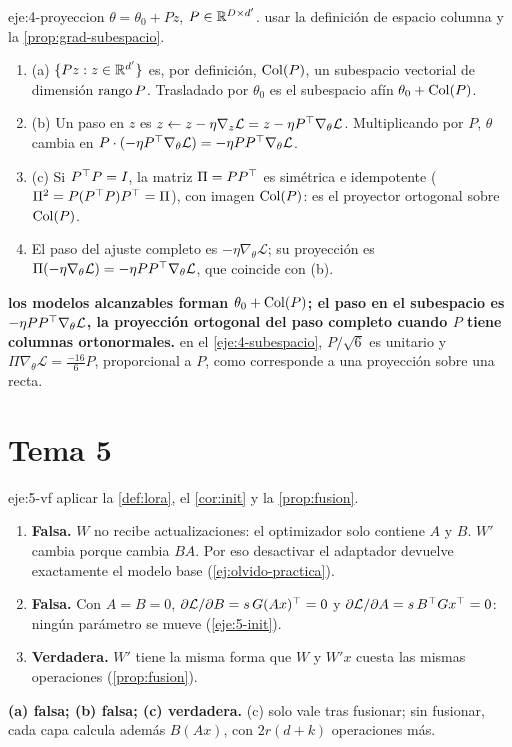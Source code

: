 \begin{solucion}{eje:4-proyeccion}
\datos $\theta=\theta_0+Pz$, $P\in\mathbb{R}^{D\times d'}$.
\planteamiento usar la definición de espacio columna y la \cref{prop:grad-subespacio}.
\pasos
\begin{enumerate}[label=\arabic*.]
  \item (a) $\{Pz:z\in\mathbb{R}^{d'}\}$ es, por definición, $\operatorname{Col}(P)$, un subespacio vectorial de dimensión $\operatorname{rango} P$. Trasladado por $\theta_0$ es el subespacio afín $\theta_0+\operatorname{Col}(P)$.
  \item (b) Un paso en $z$ es $z\gets z-\eta\nabla_z\mathcal{L}=z-\eta P^{\top}\nabla_\theta\mathcal{L}$. Multiplicando por $P$, $\theta$ cambia en $P\cdot(-\eta P^{\top}\nabla_\theta\mathcal{L})=-\eta PP^{\top}\nabla_\theta\mathcal{L}$.
  \item (c) Si $P^{\top} P=I$, la matriz $\Pi=PP^{\top}$ es simétrica e idempotente ($\Pi^{2}=P(P^{\top} P)P^{\top}=\Pi$), con imagen $\operatorname{Col}(P)$: es el proyector ortogonal sobre $\operatorname{Col}(P)$.
  \item El paso del ajuste completo es $-\eta\nabla_\theta\mathcal{L}$; su proyección es $\Pi(-\eta\nabla_\theta\mathcal{L})=-\eta PP^{\top}\nabla_\theta\mathcal{L}$, que coincide con (b).
\end{enumerate}
\resultado \textbf{los modelos alcanzables forman $\theta_0+\operatorname{Col}(P)$; el paso en el subespacio es $-\eta PP^{\top}\nabla_\theta\mathcal{L}$, la proyección ortogonal del paso completo cuando $P$ tiene columnas ortonormales.}
\comprobacion en el \cref{eje:4-subespacio}, $P/\sqrt6$ es unitario y $\Pi\nabla_\theta\mathcal{L}=\frac{-16}{6}P$, proporcional a $P$, como corresponde a una proyección sobre una recta.
\end{solucion}

\section{Tema 5}

\begin{solucion}{eje:5-vf}
\planteamiento aplicar la \cref{def:lora}, el \cref{cor:init} y la \cref{prop:fusion}.
\pasos
\begin{enumerate}[label=(\alph*)]
  \item \textbf{Falsa.} $W$ no recibe actualizaciones: el optimizador solo contiene $A$ y $B$. $W'$ cambia porque cambia $BA$. Por eso desactivar el adaptador devuelve exactamente el modelo base (\cref{ej:olvido-practica}).
  \item \textbf{Falsa.} Con $A=B=0$, $\partial\mathcal{L}/\partial B=s\,G(Ax)^{\top}=0$ y $\partial\mathcal{L}/\partial A=s\,B^{\top} Gx^{\top}=0$: ningún parámetro se mueve (\cref{eje:5-init}).
  \item \textbf{Verdadera.} $W'$ tiene la misma forma que $W$ y $W'x$ cuesta las mismas operaciones (\cref{prop:fusion}).
\end{enumerate}
\resultado \textbf{(a) falsa; (b) falsa; (c) verdadera.}
\comprobacion (c) solo vale tras fusionar; sin fusionar, cada capa calcula además $B(Ax)$, con $2r(d+k)$ operaciones más.
\end{solucion}

